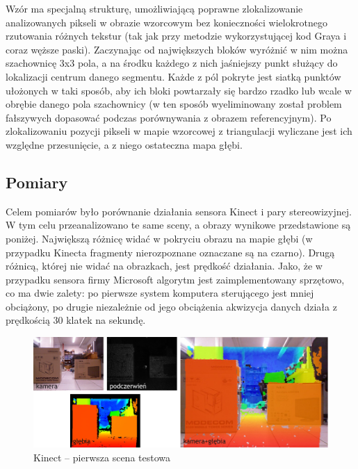 Wzór ma specjalną strukturę, umożliwiającą poprawne zlokalizowanie analizowanych 
pikseli w obrazie wzorcowym bez konieczności wielokrotnego rzutowania różnych
tekstur (tak jak przy metodzie wykorzystującej kod Graya i coraz węższe paski).
Zaczynając od największych bloków wyróżnić w nim można szachownicę 3x3 pola, a na
środku każdego z nich jaśniejszy punkt służący do lokalizacji centrum danego segmentu.
Każde z pól pokryte jest siatką punktów ułożonych w taki sposób, aby ich bloki
powtarzały się bardzo rzadko lub wcale w obrębie danego pola szachownicy (w ten
sposób wyeliminowany został problem fałszywych dopasować podczas porównywania
z obrazem referencyjnym). Po zlokalizowaniu pozycji pikseli w mapie wzorcowej
z triangulacji wyliczane jest ich względne przesunięcie, a z niego ostateczna
mapa głębi.

\subsection{Pomiary}

Celem pomiarów było porównanie działania sensora Kinect i pary stereowizyjnej.
W tym celu przeanalizowano te same sceny, a obrazy wynikowe przedstawione są
poniżej. Największą różnicę widać w pokryciu obrazu na mapie głębi (w przypadku
Kinecta fragmenty nierozpoznane oznaczane są na czarno). Drugą różnicą, której
nie widać na obrazkach, jest prędkość działania. Jako, że w przypadku sensora
firmy Microsoft algorytm jest zaimplementowany sprzętowo, co ma dwie zalety:
po pierwsze system komputera sterującego jest mniej obciążony, po drugie niezależnie
od jego obciążenia akwizycja danych działa z prędkością 30 klatek na sekundę.

\begin{figure}[h!]
\centering
\includegraphics[width=\columnwidth]{../img/kinect_1}
\caption[Kinect -- pierwsza scena testowa]{Kinect -- pierwsza scena testowa}
\label{fig:kinect_1}
\end{figure}

